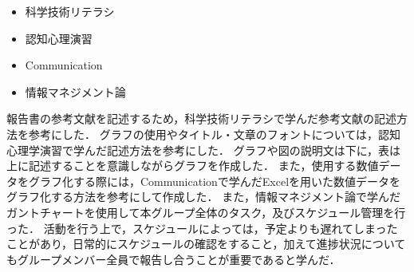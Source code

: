 \documentclass[../report]{subfiles}
\begin{document}
\begin{itemize}
    \item 科学技術リテラシ
    \item 認知心理演習
    \item Communication
    \item 情報マネジメント論
\end{itemize}

報告書の参考文献を記述するため，科学技術リテラシで学んだ参考文献の記述方法を参考にした．
グラフの使用やタイトル・文章のフォントについては，認知心理学演習で学んだ記述方法を参考にした．
グラフや図の説明文は下に，表は上に記述することを意識しながらグラフを作成した．
また，使用する数値データをグラフ化する際には，Communicationで学んだExcelを用いた数値データをグラフ化する方法を参考にして作成した．
また，情報マネジメント論で学んだガントチャートを使用して本グループ全体のタスク，及びスケジュール管理を行った．
活動を行う上で，スケジュールによっては，予定よりも遅れてしまったことがあり，日常的にスケジュールの確認をすること，加えて進捗状況についてもグループメンバー全員で報告し合うことが重要であると学んだ．
\end{document}
